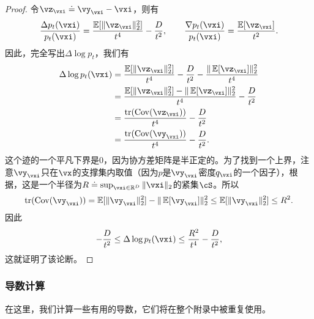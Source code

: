 \documentclass[../../book-main.tex]{subfiles}
\begin{document}
\begin{proof}
    令\(\vz_{\vxi} \doteq \vy_{\vxi} - \vxi\)，则有
    \begin{equation}
        \frac{\Delta p_{t}(\vxi)}{p_{t}(\vxi)} = \frac{\Ex[\norm{\vz_{\vxi}}_{2}^{2}]}{t^{4}} - \frac{D}{t^{2}}, \qquad \frac{\nabla p_{t}(\vxi)}{p_{t}(\vxi)} = \frac{\Ex[\vz_{\vxi}]}{t^{2}}.
    \end{equation}
    因此，完全写出\(\Delta \log p_{t}\)，我们有
    \begin{align}
        \Delta \log p_{t}(\vxi)
        &= \frac{\Ex[\norm{\vz_{\vxi}}_{2}^{2}]}{t^{4}} - \frac{D}{t^{2}} - \frac{\norm{\Ex[\vz_{\vxi}]}_{2}^{2}}{t^{4}} \\
        &= \frac{\Ex[\norm{\vz_{\vxi}}_{2}^{2}] - \norm{\Ex[\vz_{\vxi}]}_{2}^{2}}{t^{4}} - \frac{D}{t^{2}} \\
        &= \frac{\tr(\Cov(\vz_{\vxi}))}{t^{4}} - \frac{D}{t^{2}} \\
        &= \frac{\tr(\Cov(\vy_{\vxi}))}{t^{4}} - \frac{D}{t^{2}}.
    \end{align}
    这个迹的一个平凡下界是\(0\)，因为协方差矩阵是半正定的。为了找到一个上界，注意\(\vy_{\vxi}\)只在\(\vx\)的支撑集内取值（因为\(p\)是\(\vy_{\vxi}\)密度\(q_{\vxi}\)的一个因子），根据，这是一个半径为\(R \doteq \sup_{\vxi \in \R^{D}}\norm{\vxi}_{2}\)的紧集\(\cS\)。所以
    \begin{equation}
        \tr(\Cov(\vy_{\vxi})) = \Ex[\norm{\vy_{\vxi}}_{2}^{2}] - \norm{\Ex[\vy_{\vxi}]}_{2}^{2} \leq \Ex[\norm{\vy_{\vxi}}_{2}^{2}] \leq R^{2}.
    \end{equation}
    因此
    \begin{equation}
        -\frac{D}{t^{2}} \leq \Delta \log p_{t}(\vxi) \leq \frac{R^{2}}{t^{4}} - \frac{D}{t^{2}},
    \end{equation}
    这就证明了该论断。
\end{proof}

\subsubsection{导数计算}

在这里，我们计算一些有用的导数，它们将在整个附录中被重复使用。
\end{document}
